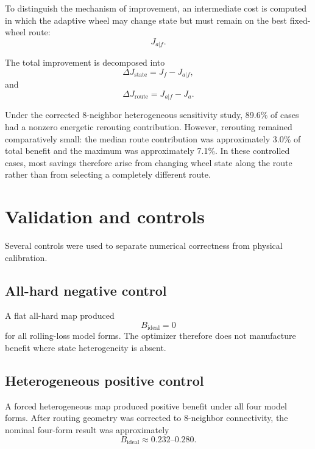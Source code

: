 \documentclass[11pt]{article}
\begin{document}
To distinguish the mechanism of improvement, an intermediate cost is computed in which the adaptive wheel may change state but must remain on the best fixed-wheel route:
\begin{equation}
J_{a|f}.
\end{equation}

The total improvement is decomposed into
\begin{equation}
\Delta J_{\mathrm{state}}=J_f-J_{a|f},
\end{equation}
and
\begin{equation}
\Delta J_{\mathrm{route}}=J_{a|f}-J_a.
\end{equation}

Under the corrected 8-neighbor heterogeneous sensitivity study, 89.6\% of cases had a nonzero energetic rerouting contribution. However, rerouting remained comparatively small: the median route contribution was approximately 3.0\% of total benefit and the maximum was approximately 7.1\%. In these controlled cases, most savings therefore arise from changing wheel state along the route rather than from selecting a completely different route.

\section{Validation and controls}

Several controls were used to separate numerical correctness from physical calibration.

\subsection{All-hard negative control}
A flat all-hard map produced
\begin{equation}
B_{\mathrm{ideal}}=0
\end{equation}
for all rolling-loss model forms. The optimizer therefore does not manufacture benefit where state heterogeneity is absent.

\subsection{Heterogeneous positive control}
A forced heterogeneous map produced positive benefit under all four model forms. After routing geometry was corrected to 8-neighbor connectivity, the nominal four-form result was approximately
\begin{equation}
B_{\mathrm{ideal}}\approx0.232\text{--}0.280.
\end{equation}
\end{document}
